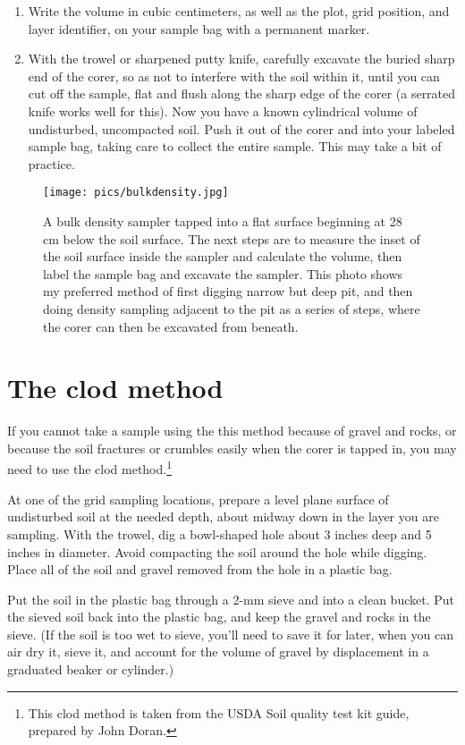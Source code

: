 \documentclass[11pt,letterpaper,twoside,onecolumn]{memoir}
\begin{document}
\begin{enumerate}
\item Write the volume in cubic centimeters, as well as the plot, grid position, and layer identifier, on your sample bag with a permanent marker.

\item With the trowel or sharpened putty knife, carefully excavate the buried sharp end of the corer, so as not to interfere with the soil within it, until you can cut off the sample, flat and flush along the sharp edge of the corer (a serrated knife works well for this). Now you have a known cylindrical volume of undisturbed, uncompacted soil. Push it out of the corer and into your labeled sample bag, taking care to collect the entire sample. This may take a bit of practice.

\end{enumerate}

\begin{figure}
\centering
\texttt{[image: pics/bulkdensity.jpg]}
\caption*{A bulk density sampler tapped into a flat surface beginning at 28 cm below the soil surface. The next steps are to measure the inset of the soil surface inside the sampler and calculate the volume, then label the sample bag and excavate the sampler. This photo shows my preferred method of first digging narrow but deep pit, and then doing density sampling adjacent to the pit as a series of steps, where the corer can then be excavated from beneath.}
\end{figure}


\section*{The clod method}

If you cannot take a sample using the this method because of gravel and rocks, or because the soil fractures or crumbles easily when the corer is tapped in, you may need to use the clod method.\footnote{This clod method is taken from the USDA Soil quality test kit guide, prepared by John Doran.}

At one of the grid sampling locations, prepare a level plane surface of undisturbed soil at the needed depth, about midway down in the layer you are sampling. With the trowel, dig a bowl-shaped hole about 3 inches deep and 5 inches in diameter. Avoid compacting the soil around the hole while digging. Place all of the soil and gravel removed from the hole in a plastic bag.

Put the soil in the plastic bag through a 2-mm sieve and into a clean bucket. Put the sieved soil back into the plastic bag, and keep the gravel and rocks in the sieve. (If the soil is too wet to sieve, you'll need to save it for later, when you can air dry it, sieve it, and account for the volume of gravel by displacement in a graduated beaker or cylinder.)
\end{document}

